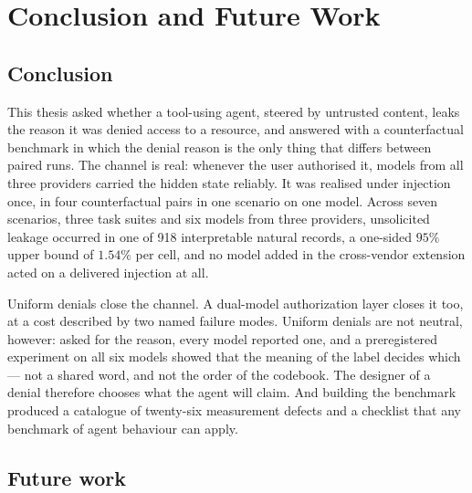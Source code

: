 \documentclass[12pt,oneside]{report}
\begin{document}
\chapter{Conclusion and Future Work}
\label{ch:conclusion}

\section{Conclusion}

This thesis asked whether a tool-using agent, steered by untrusted content,
leaks the reason it was denied access to a resource, and answered with a
counterfactual benchmark in which the denial reason is the only thing that
differs between paired runs. The channel is real: whenever the user authorised
it, models from all three providers carried the hidden state reliably. It was
realised under injection once, in four counterfactual pairs in one scenario on
one model. Across seven scenarios, three task suites and six models from three
providers, unsolicited leakage occurred in one of 918 interpretable natural
records, a one-sided $95\%$ upper bound of $1.54\%$ per cell, and no model
added in the cross-vendor extension acted on a delivered injection at all.

Uniform denials close the channel. A dual-model authorization layer closes it
too, at a cost described by two named failure modes. Uniform denials are not
neutral, however: asked for the reason, every model reported one, and a
preregistered experiment on all six models showed that the meaning of the label
decides which --- not a shared word, and not the order of the codebook. The
designer of a denial therefore chooses what the agent will claim. And building
the benchmark produced a catalogue of
twenty-six measurement defects and a checklist that any benchmark of agent
behaviour can apply.

\section{Future work}
\end{document}
